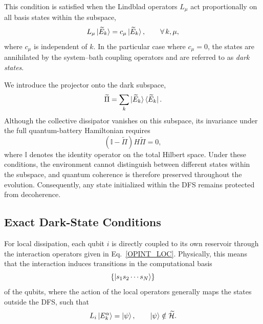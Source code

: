 \documentclass[aps,superscriptaddress,twocolumn,pre,longbibliography,floatfix]{revtex4-1}
\begin{document}
	This condition is satisfied when the Lindblad operators $L_{\mu}$ act proportionally on all basis states within the subspace,
	\begin{equation}
		\label{DFS_CONDITION}
		L_{\mu}\ket{\widetilde{E}_k}
		=
		c_{\mu}\ket{\widetilde{E}_k},
		\qquad
		\forall\, k,\mu,
	\end{equation}
	where $c_{\mu}$ is independent of $k$. In the particular case where
	$c_{\mu}=0$, the states are annihilated by the system--bath coupling operators and are referred to as \emph{dark states}.
	
	We introduce the projector onto the dark subspace,
	\begin{equation}
		\widetilde{\Pi}
		=
		\sum_k
		\ket{\widetilde{E}_k}
		\bra{\widetilde{E}_k}.
	\end{equation}
	Although the collective dissipator vanishes on this subspace, its invariance under the full quantum-battery Hamiltonian requires
	\begin{equation}\label{Condition_of_invariant}
		\left(
		\mathbb{I}
		-
		\widetilde{\Pi}
		\right)
		H
		\widetilde{\Pi}
		=
		0,
	\end{equation}
	where $\mathbb{I}$ denotes the identity operator on the total Hilbert space. Under these conditions, the environment cannot distinguish between different states within the subspace, and quantum coherence is therefore preserved throughout the evolution. Consequently, any state initialized within the DFS remains protected from decoherence.
	
	
	
	\subsection{Exact Dark-State Conditions}
	
	For local dissipation, each qubit $i$ is directly coupled to its own reservoir through the interaction operators given in Eq.~\eqref{OPINT_LOC}. Physically, this means that the interaction induces transitions in the computational basis
	\begin{equation}
		\left\{
		\ket{s_1 s_2 \cdots s_N}
		\right\}
	\end{equation}
	of the qubits, where the action of the local operators generally maps the states outside the DFS, such that
	\begin{equation}
		L_i \ket{E_k^\alpha}
		=
		\ket{\psi},
		\qquad
		\ket{\psi}
		\notin
		\widetilde{\mathcal{H}}.
	\end{equation}
	
\end{document}
